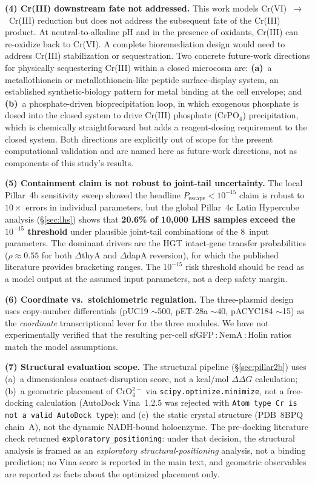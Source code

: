 \documentclass[10pt,twocolumn,letterpaper,
              colorlinks=true,
              linkcolor=blue!70!black,
              citecolor=blue!70!black,
              urlcolor=blue!70!black,
              pdfborder={0 0 0}]{article}
\begin{document}
\medskip
\noindent\textbf{(4) Cr(III) downstream fate not addressed.}
This work models Cr(VI)~$\rightarrow$~Cr(III) reduction but does not
address the subsequent fate of the Cr(III) product. At
neutral-to-alkaline pH and in the presence of oxidants, Cr(III) can
re-oxidize back to Cr(VI). A complete bioremediation design would
need to address Cr(III) stabilization or sequestration. Two concrete
future-work directions for physically sequestering Cr(III) within a
closed microcosm are: \textbf{(a)}~a metallothionein or
metallothionein-like peptide surface-display system, an established
synthetic-biology pattern for metal binding at the cell envelope; and
\textbf{(b)}~a phosphate-driven bioprecipitation loop, in which
exogenous phosphate is dosed into the closed system to drive
Cr(III) phosphate (CrPO$_4$) precipitation, which is chemically
straightforward but adds a reagent-dosing requirement to the closed
system. Both directions are explicitly out of scope for the present
computational validation and are named here as future-work
directions, not as components of this study's results.

\medskip
\noindent\textbf{(5) Containment claim is not robust to joint-tail
uncertainty.}
The local Pillar~4b sensitivity sweep showed the headline
$P_{\text{escape}} < 10^{-15}$ claim is robust to $10\times$ errors in
individual parameters, but the global Pillar~4c Latin Hypercube analysis
(\S\ref{sec:lhs}) shows that \textbf{20.6\% of 10{,}000 LHS samples
exceed the $10^{-15}$ threshold} under plausible joint-tail combinations
of the 8~input parameters. The dominant drivers are the HGT
intact-gene transfer probabilities ($\rho \approx 0.55$ for both
$\Delta$thyA and $\Delta$dapA reversion), for which the published
literature provides bracketing ranges. The $10^{-15}$ risk threshold
should be read as a model output at the assumed input parameters, not a
deep safety margin.

\medskip
\noindent\textbf{(6) Coordinate vs.\ stoichiometric regulation.}
The three-plasmid design uses copy-number differentials (pUC19
$\sim$500, pET-28a $\sim$40, pACYC184 $\sim$15) as the
\textit{coordinate} transcriptional lever for the three modules. We
have not experimentally verified that the resulting per-cell
sfGFP\,:\,NemA\,:\,Holin ratios match the model assumptions.

\medskip
\noindent\textbf{(7) Structural evaluation scope.}
The structural pipeline (\S\ref{sec:pillar2b}) uses (a)~a dimensionless
contact-disruption score, not a kcal/mol $\Delta\Delta G$ calculation;
(b)~a geometric placement of CrO$_4^{2-}$ via
\texttt{scipy.optimize.minimize}, not a free-docking calculation
(AutoDock Vina~1.2.5 was rejected with \texttt{Atom type Cr is not a
valid AutoDock type}); and (c)~the static crystal structure (PDB~8BPQ
chain~A), not the dynamic NADH-bound holoenzyme. The pre-docking
literature check returned \texttt{exploratory\_positioning}: under that
decision, the structural analysis is framed as an \textit{exploratory
structural-positioning} analysis, not a binding prediction; no Vina
score is reported in the main text, and geometric observables are
reported as facts about the optimized placement only.
\end{document}
